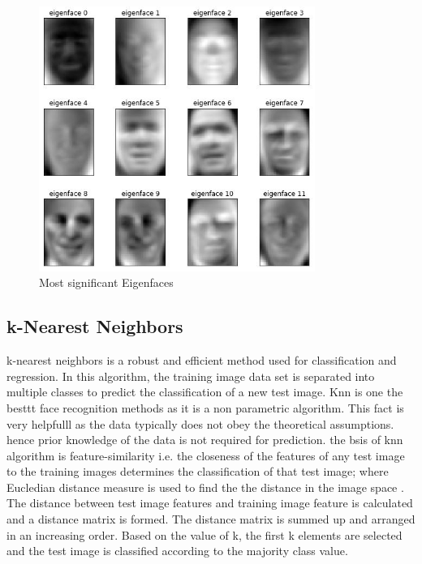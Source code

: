 \documentclass[conference]{IEEEtran}
\begin{document}
\begin{figure}[h!]
 \centering
 \includegraphics[width = 9cm]{eigenface.JPG}
 \caption{ Most significant Eigenfaces}
 \label{fig 1: eigenface}
\end{figure}
	

\subsection{k-Nearest Neighbors } 
\label{subsec: 1b.Knn}
k-nearest neighbors is a robust and efficient method used for classification and regression. In this algorithm, the training image data set is separated into multiple classes to predict the classification of a new test image. Knn is one the besttt face recognition methods as it is a non parametric algorithm. This fact is very helpfulll as the data typically does not obey the theoretical assumptions. hence prior knowledge of the data is not required for prediction. the bsis of knn algorithm is feature-similarity  i.e. the closeness of the features of any test image to the training images determines the classification of that test image; where Eucledian distance measure is used to find the the distance in the image space \cite{wang2005euclidean}. The distance between test image features and training image feature is calculated and a distance matrix is formed. The distance matrix is summed up and arranged in an increasing order. Based on the value of k, the first k elements are selected and the test image is classified according to the majority class value. \cite{zhang2007ml}
\end{document}
